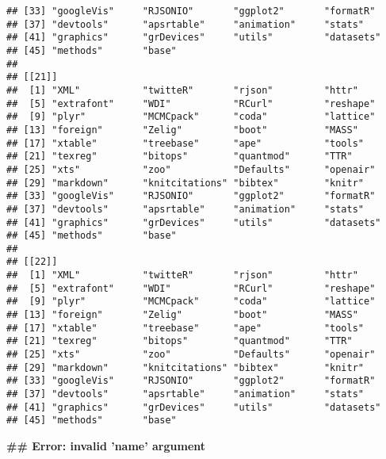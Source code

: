 \begin{knitrout}
\begin{kframe}
\begin{verbatim}
## [33] "googleVis"     "RJSONIO"       "ggplot2"       "formatR"      
## [37] "devtools"      "apsrtable"     "animation"     "stats"        
## [41] "graphics"      "grDevices"     "utils"         "datasets"     
## [45] "methods"       "base"         
## 
## [[21]]
##  [1] "XML"           "twitteR"       "rjson"         "httr"         
##  [5] "extrafont"     "WDI"           "RCurl"         "reshape"      
##  [9] "plyr"          "MCMCpack"      "coda"          "lattice"      
## [13] "foreign"       "Zelig"         "boot"          "MASS"         
## [17] "xtable"        "treebase"      "ape"           "tools"        
## [21] "texreg"        "bitops"        "quantmod"      "TTR"          
## [25] "xts"           "zoo"           "Defaults"      "openair"      
## [29] "markdown"      "knitcitations" "bibtex"        "knitr"        
## [33] "googleVis"     "RJSONIO"       "ggplot2"       "formatR"      
## [37] "devtools"      "apsrtable"     "animation"     "stats"        
## [41] "graphics"      "grDevices"     "utils"         "datasets"     
## [45] "methods"       "base"         
## 
## [[22]]
##  [1] "XML"           "twitteR"       "rjson"         "httr"         
##  [5] "extrafont"     "WDI"           "RCurl"         "reshape"      
##  [9] "plyr"          "MCMCpack"      "coda"          "lattice"      
## [13] "foreign"       "Zelig"         "boot"          "MASS"         
## [17] "xtable"        "treebase"      "ape"           "tools"        
## [21] "texreg"        "bitops"        "quantmod"      "TTR"          
## [25] "xts"           "zoo"           "Defaults"      "openair"      
## [29] "markdown"      "knitcitations" "bibtex"        "knitr"        
## [33] "googleVis"     "RJSONIO"       "ggplot2"       "formatR"      
## [37] "devtools"      "apsrtable"     "animation"     "stats"        
## [41] "graphics"      "grDevices"     "utils"         "datasets"     
## [45] "methods"       "base"
\end{verbatim}


{\ttfamily\noindent\bfseries\textcolor{errorcolor}{\#\# Error: invalid 'name' argument}}\end{kframe}
\end{knitrout}

